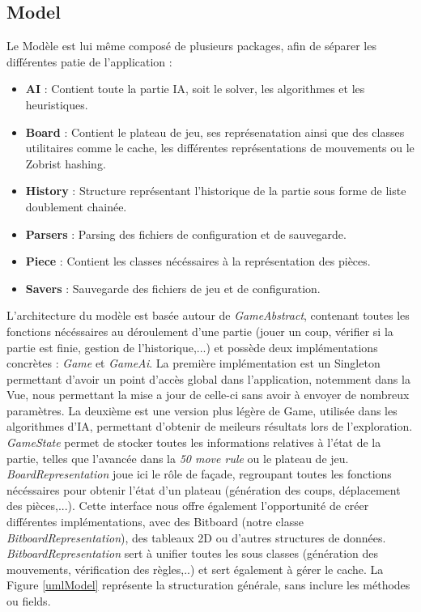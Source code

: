 \documentclass{article}
\begin{document}
\subsection{Model}
Le Modèle est lui même composé de plusieurs packages, afin de séparer les différentes patie de l'application :
\begin{itemize}
    \item \textbf{AI} : Contient toute la partie IA, soit le solver, les algorithmes et les heuristiques.
    \item \textbf{Board} : Contient le plateau de jeu, ses représenatation ainsi que des classes utilitaires comme le cache,
    les différentes représentations de mouvements ou le Zobrist hashing.
    \item \textbf{History} : Structure représentant l'historique de la partie sous forme de liste doublement chainée.
    \item \textbf{Parsers} : Parsing des fichiers de configuration et de sauvegarde.
    \item \textbf{Piece} : Contient les classes nécéssaires à la représentation des pièces.
    \item \textbf{Savers} : Sauvegarde des fichiers de jeu et de configuration.
\end{itemize}

L'architecture du modèle est basée autour de \textit{GameAbstract}, contenant toutes les fonctions nécéssaires au déroulement d'une partie 
(jouer un coup, vérifier si la partie est finie, gestion de l'historique,...) et possède deux implémentations concrètes : \textit{Game} et \textit{GameAi}.
La première implémentation est un Singleton permettant d'avoir un point d'accès global dans l'application, notemment dans la Vue, nous permettant la mise a jour de celle-ci sans avoir à envoyer de nombreux paramètres.
La deuxième est une version plus légère de Game, utilisée dans les algorithmes d'IA, permettant d'obtenir de meileurs résultats lors de l'exploration.
\textit{GameState} permet de stocker toutes les informations relatives à l'état de la partie, telles que l'avancée dans la \textit{50 move rule} ou le plateau de jeu.
\textit{BoardRepresentation} joue ici le rôle de façade, regroupant toutes les fonctions nécéssaires pour obtenir l'état d'un plateau (génération des coups, déplacement des pièces,...).
Cette interface nous offre également l'opportunité de créer différentes implémentations, avec des Bitboard (notre classe \textit{BitboardRepresentation}), des tableaux 2D ou d'autres structures de données.
\textit{BitboardRepresentation} sert à unifier toutes les sous classes (génération des mouvements, vérification des règles,..) et sert également à gérer le cache.
La Figure \ref{umlModel} représente la structuration générale, sans inclure les méthodes ou fields.
\end{document}
